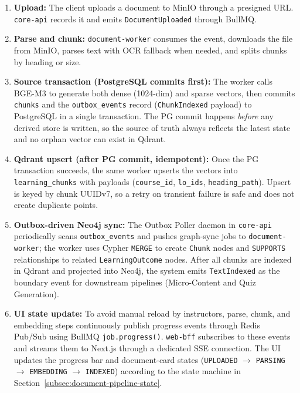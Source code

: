 \begin{enumerate}
    \item \textbf{Upload:} The client uploads a document to MinIO through
          a presigned URL. \texttt{core-api} records it and emits
          \texttt{DocumentUploaded} through BullMQ.
    \item \textbf{Parse and chunk:} \texttt{document-worker} consumes the
          event, downloads the file from MinIO, parses text with OCR
          fallback when needed, and splits chunks by heading or size.
    \item \textbf{Source transaction (PostgreSQL commits first):} The
          worker calls BGE-M3 to generate both dense (1024-dim) and
          sparse vectors, then commits \texttt{chunks} and the
          \texttt{outbox\_events} record (\texttt{ChunkIndexed} payload)
          to PostgreSQL in a single transaction. The PG commit happens
          \emph{before} any derived store is written, so the source of
          truth always reflects the latest state and no orphan vector can
          exist in Qdrant.
    \item \textbf{Qdrant upsert (after PG commit, idempotent):} Once the
          PG transaction succeeds, the same worker upserts the vectors
          into \texttt{learning\_chunks} with payloads
          (\texttt{course\_id}, \texttt{lo\_ids},
          \texttt{heading\_path}). Upsert is keyed by chunk UUIDv7, so a
          retry on transient failure is safe and does not create
          duplicate points.
    \item \textbf{Outbox-driven Neo4j sync:} The Outbox Poller daemon
          in \texttt{core-api} periodically scans
          \texttt{outbox\_events} and pushes graph-sync jobs to
          \texttt{document-worker}; the worker uses Cypher
          \texttt{MERGE} to create \texttt{Chunk} nodes and
          \texttt{SUPPORTS} relationships to related
          \texttt{LearningOutcome} nodes. After all chunks are indexed
          in Qdrant and projected into Neo4j, the system emits
          \texttt{TextIndexed} as the boundary event for downstream
          pipelines (Micro-Content and Quiz Generation).
    \item \textbf{UI state update:} To avoid manual reload by instructors,
          parse, chunk, and embedding steps continuously publish progress
          events through Redis Pub/Sub using BullMQ
          \texttt{job.progress()}. \texttt{web-bff} subscribes to these
          events and streams them to Next.js through a dedicated SSE
          connection. The UI updates the progress bar and document-card
          states (\texttt{UPLOADED} $\to$ \texttt{PARSING} $\to$
          \texttt{EMBEDDING} $\to$ \texttt{INDEXED}) according to the
          state machine in Section~\ref{subsec:document-pipeline-state}.
\end{enumerate}

